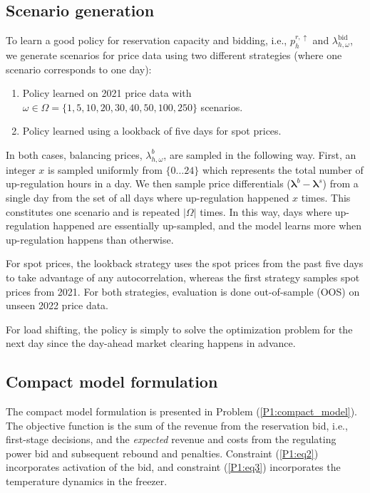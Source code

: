 \subsection{Scenario generation}\label{sec:scenario_generation}

To learn a good policy for reservation capacity and bidding, i.e., $p_{h}^{r,\uparrow}$ and $\lambda_{h,\omega}^{\text{bid}}$, we generate scenarios for price data using two different strategies (where one scenario corresponds to one day):

\begin{enumerate}
    \item Policy learned on 2021 price data with $\omega \in \Omega = \{ 1, 5, 10, 20, 30, 40, 50, 100, 250 \}$ scenarios.
    \item Policy learned using a lookback of five days for spot prices.
\end{enumerate}

In both cases, balancing prices, $\lambda_{h,\omega}^{b}$, are sampled in the following way. First, an integer $x$ is sampled uniformly from $\{0 \ldots 24\}$ which represents the total number of up-regulation hours in a day. We then sample price differentials ($\bm{\lambda}^{b}-\bm{\lambda}^{s}$) from a single day from the set of all days where up-regulation happened $x$ times. This constitutes one scenario and is repeated $|\Omega|$ times. In this way, days where up-regulation happened are essentially up-sampled, and the model learns more when up-regulation happens than otherwise.

For spot prices, the lookback strategy uses the spot prices from the past five days to take advantage of any autocorrelation, whereas the first strategy samples spot prices from 2021. For both strategies, evaluation is done out-of-sample (OOS) on unseen 2022 price data.

For load shifting, the policy is simply to solve the optimization problem for the next day since the day-ahead market clearing happens in advance.

\subsection{Compact model formulation}

The compact model formulation is presented in Problem (\ref{P1:compact_model}). The objective function is the sum of the revenue from the reservation bid, i.e., first-stage decisions, and the \textit{expected} revenue and costs from the regulating power bid and subsequent rebound and penalties. Constraint (\ref{P1:eq2}) incorporates activation of the bid, and constraint (\ref{P1:eq3}) incorporates the temperature dynamics in the freezer.


